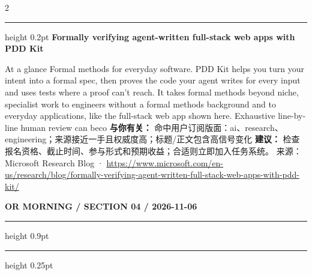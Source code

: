 \documentclass[10.5pt]{ctexart}
\begin{document}
\begin{multicols}{2}
\vspace{2mm}
\hrule height 0.2pt
\vspace{2mm}
{\large\bfseries Formally verifying agent-written full-stack web apps with PDD Kit}\par
At a glance Formal methods for everyday software. PDD Kit helps you turn your intent into a formal spec, then proves the code your agent writes for every input and uses tests where a proof can’t reach. It takes formal methods beyond niche, specialist work to engineers without a formal methods background and to everyday applications, like the full-stack web app shown here. Exhaustive line-by-line human review can beco
\textbf{与你有关：} 命中用户订阅版面：ai、research、engineering；来源接近一手且权威度高；标题/正文包含高信号变化
\textbf{建议：} 检查报名资格、截止时间、参与形式和预期收益；合适则立即加入任务系统。
{\footnotesize\color{ormuted} 来源：Microsoft Research Blog · \url{https://www.microsoft.com/en-us/research/blog/formally-verifying-agent-written-full-stack-web-apps-with-pdd-kit/}}
\end{multicols}
\newpage
{\small\bfseries OR MORNING / SECTION 04 / 2026-11-06}
\vspace{2mm}
\hrule height 0.9pt
\vspace{1.5mm}
\hrule height 0.25pt
\vspace{4mm}
\end{document}
